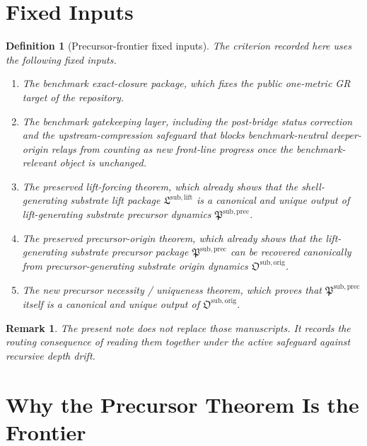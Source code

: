 \documentclass[11pt]{article}
\newcommand{\LiftPackage}{\mathfrak L^{\mathrm{sub,lift}}}
\newcommand{\PrecursorPackage}{\mathfrak P^{\mathrm{sub,prec}}}
\newcommand{\OriginPackage}{\mathfrak O^{\mathrm{sub,orig}}}
\newtheorem{definition}{Definition}
\newtheorem{remark}{Remark}
\begin{document}
\section{Fixed Inputs}

\begin{definition}[Precursor-frontier fixed inputs]
The criterion recorded here uses the following fixed inputs.
\begin{enumerate}
    \item The benchmark exact-closure package, which fixes the public one-metric GR target of the repository.
    \item The benchmark gatekeeping layer, including the post-bridge status correction and the upstream-compression safeguard that blocks benchmark-neutral deeper-origin relays from counting as new front-line progress once the benchmark-relevant object is unchanged.
    \item The preserved lift-forcing theorem, which already shows that the shell-generating substrate lift package \(\LiftPackage\) is a canonical and unique output of lift-generating substrate precursor dynamics \(\PrecursorPackage\).
    \item The preserved precursor-origin theorem, which already shows that the lift-generating substrate precursor package \(\PrecursorPackage\) can be recovered canonically from precursor-generating substrate origin dynamics \(\OriginPackage\).
    \item The new precursor necessity / uniqueness theorem, which proves that \(\PrecursorPackage\) itself is a canonical and unique output of \(\OriginPackage\).
\end{enumerate}
\end{definition}

\begin{remark}
The present note does not replace those manuscripts. It records the routing consequence of reading them together under the active safeguard against recursive depth drift.
\end{remark}

\section{Why the Precursor Theorem Is the Frontier}
\end{document}
